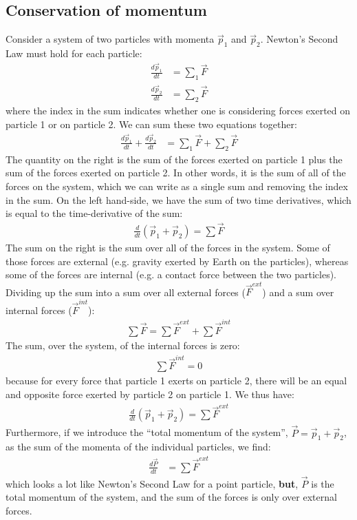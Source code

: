 \subsection{Conservation of momentum}
Consider a system of two particles with momenta $\vec p_1$ and $\vec p_2$.  Newton's Second Law must hold for each particle:
\begin{align*}
\frac{d\vec p_1}{dt}&=\sum_1 \vec F\\
\frac{d\vec p_2}{dt}&=\sum_2 \vec F
\end{align*}
where the index in the sum indicates whether one is considering forces exerted on particle 1 or on particle 2. We can sum these two equations together:
\begin{align*}
\frac{d\vec p_1}{dt}+\frac{d\vec p_2}{dt} &= \sum_1 \vec F+\sum_2 \vec F
\end{align*}
The quantity on the right is the sum of the forces exerted on particle 1 plus the sum of the forces exerted on particle 2. In other words, it is the sum of all of the forces on the system, which we can write as a single sum and removing the index in the sum. On the left hand-side, we have the sum of two time derivatives, which is equal to the time-derivative of the sum:
\begin{align*}
\frac{d}{dt}(\vec p_1 + \vec p_2) = \sum \vec F
\end{align*}
The sum on the right is the sum over all of the forces in the system. Some of those forces are external (e.g. gravity exerted by Earth on the particles), whereas some of the forces are internal (e.g. a contact force between the two particles). Dividing up the sum into a sum over all external forces ($\vec F^{ext}$) and a sum over internal forces ($\vec F^{int}$):
\begin{align*}
\sum \vec F = \sum \vec F^{ext} + \sum \vec F^{int} 
\end{align*}
The sum, over the system, of the internal forces is zero:
\begin{align*}
\sum \vec F^{int} = 0
\end{align*}
because for every force that particle 1 exerts on particle 2, there will be an equal and opposite force exerted by particle 2 on particle 1. We thus have:
\begin{align*}
\frac{d}{dt}(\vec p_1 + \vec p_2) = \sum \vec F^{ext}
\end{align*}
Furthermore, if we introduce the ``total momentum of the system'', $\vec P=\vec p_1 + \vec p_2$, as the sum of the momenta of the individual particles, we find:
\begin{align*}
\frac{d\vec P}{dt} &= \sum \vec F^{ext}
\end{align*}
which looks a lot like Newton's Second Law for a point particle, \textbf{but}, $\vec P$ is the total momentum of the system, and the sum of the forces is only over external forces.

